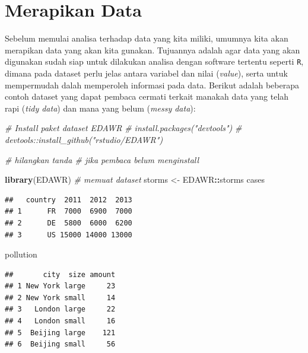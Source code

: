 \documentclass[]{book}
\newenvironment{Shaded}{\begin{snugshade}}{\end{snugshade}}
\newcommand{\KeywordTok}[1]{\textcolor[rgb]{0.13,0.29,0.53}{\textbf{#1}}}
\newcommand{\StringTok}[1]{\textcolor[rgb]{0.31,0.60,0.02}{#1}}
\newcommand{\CommentTok}[1]{\textcolor[rgb]{0.56,0.35,0.01}{\textit{#1}}}
\newcommand{\OperatorTok}[1]{\textcolor[rgb]{0.81,0.36,0.00}{\textbf{#1}}}
\newcommand{\NormalTok}[1]{#1}
\begin{document}
\section{Merapikan Data}\label{merapikan-data}

Sebelum memulai analisa terhadap data yang kita miliki, umumnya kita
akan merapikan data yang akan kita gunakan. Tujuannya adalah agar data
yang akan digunakan sudah siap untuk dilakukan analisa dengan software
tertentu seperti \texttt{R}, dimana pada dataset perlu jelas antara
variabel dan nilai (\emph{value}), serta untuk mempermudah dalah
memperoleh informasi pada data. Berikut adalah beberapa contoh dataset
yang dapat pembaca cermati terkait manakah data yang telah rapi
(\emph{tidy data}) dan mana yang belum (\emph{messy data}):

\begin{Shaded}
\begin{Highlighting}[]
\CommentTok{# Install paket dataset EDAWR}
\CommentTok{# install.packages("devtools")}
\CommentTok{# devtools::install_github("rstudio/EDAWR")}

\CommentTok{# hilangkan tanda # jika pembaca belum menginstall}
\end{Highlighting}
\end{Shaded}

\begin{Shaded}
\begin{Highlighting}[]
\KeywordTok{library}\NormalTok{(EDAWR)}
\CommentTok{# memuat dataset}
\NormalTok{storms <-}\StringTok{ }\NormalTok{EDAWR}\OperatorTok{::}\NormalTok{storms}
\NormalTok{cases}
\end{Highlighting}
\end{Shaded}

\begin{verbatim}
##   country  2011  2012  2013
## 1      FR  7000  6900  7000
## 2      DE  5800  6000  6200
## 3      US 15000 14000 13000
\end{verbatim}

\begin{Shaded}
\begin{Highlighting}[]
\NormalTok{pollution}
\end{Highlighting}
\end{Shaded}

\begin{verbatim}
##       city  size amount
## 1 New York large     23
## 2 New York small     14
## 3   London large     22
## 4   London small     16
## 5  Beijing large    121
## 6  Beijing small     56
\end{verbatim}
\end{document}
